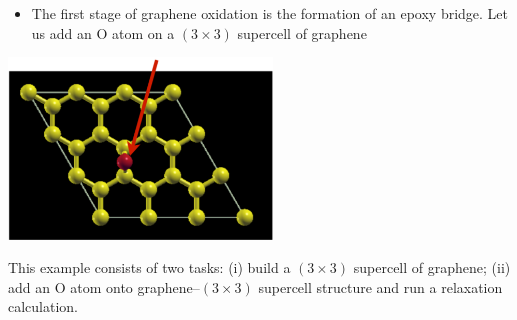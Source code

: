 \documentclass[landscape]{foils}
\begin{document}
\parbox{15cm}{
  \begin{itemize}
  \item The first stage of graphene oxidation is the formation of an
    epoxy bridge. Let us add an O atom on a $(3\times3)$ supercell of
    graphene
  \end{itemize}
}\hskip 2cm\parbox{7cm}{
  \begin{flushright}
    \includegraphics[width=7cm]{figs/graphene3x3-O.pdf}    
  \end{flushright}
}

This example consists of two tasks: (i) build a $(3\times3)$ supercell
of graphene; (ii) add an O atom onto graphene--$(3\times3)$ supercell
structure and run a relaxation calculation.
    
\end{document}

